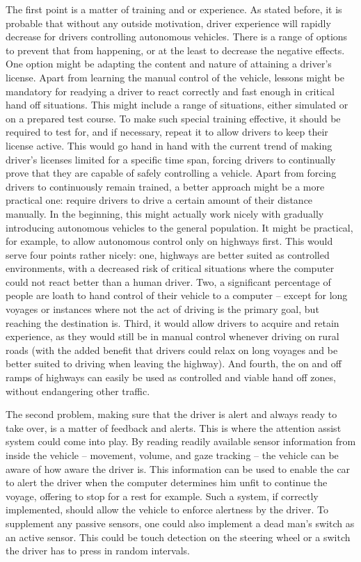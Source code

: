 \documentclass{acm_proc_article-sp}
\begin{document}
The first point is a matter of training and or experience.
As stated before, it is probable that without any outside motivation, driver experience will rapidly decrease for drivers controlling autonomous vehicles.
There is a range of options to prevent that from happening, or at the least to decrease the negative effects.
One option might be adapting the content and nature of attaining a driver's license.
Apart from learning the manual control of the vehicle, lessons might be mandatory for readying a driver to react correctly and fast enough in critical hand off situations.
This might include a range of situations, either simulated or on a prepared test course.
To make such special training effective, it should be required to test for, and if necessary, repeat it to allow drivers to keep their license active.
This would go hand in hand with the current trend of making driver's licenses limited for a specific time span, forcing drivers to continually prove that they are capable of safely controlling a vehicle.
Apart from forcing drivers to continuously remain trained, a better approach might be a more practical one: require drivers to drive a certain amount of their distance manually.
In the beginning, this might actually work nicely with gradually introducing autonomous vehicles to the general population.
It might be practical, for example, to allow autonomous control only on highways first.
This would serve four points rather nicely: one, highways are better suited as controlled environments, with a decreased risk of critical situations where the computer could not react better than a human driver.
Two, a significant percentage of people are loath to hand control of their vehicle to a computer \cite{www:power_study} – except for long voyages or instances where not the act of driving is the primary goal, but reaching the destination is.
Third, it would allow drivers to acquire and retain experience, as they would still be in manual control whenever driving on rural roads (with the added benefit that drivers could relax on long voyages and be better suited to driving when leaving the highway).
And fourth, the on and off ramps of highways can easily be used as controlled and viable hand off zones, without endangering other traffic.

The second problem, making sure that the driver is alert and always ready to take over, is a matter of feedback and alerts.
This is where the attention assist system could come into play.
By reading readily available sensor information from inside the vehicle – movement, volume, and gaze tracking – the vehicle can be aware of how aware the driver is.
This information can be used to enable the car to alert the driver when the computer determines him unfit to continue the voyage, offering to stop for a rest for example.
Such a system, if correctly implemented, should allow the vehicle to enforce alertness by the driver.
To supplement any passive sensors, one could also implement a dead man's switch as an active sensor.
This could be touch detection on the steering wheel or a switch the driver has to press in random intervals.
\end{document}
